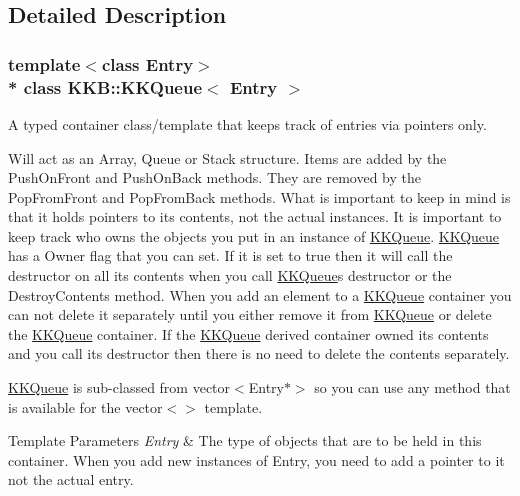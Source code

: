 \subsection{Detailed Description}
\subsubsection*{template$<$class Entry$>$\\*
class K\+K\+B\+::\+K\+K\+Queue$<$ Entry $>$}

A typed container class/template that keeps track of entries via pointers only. 

Will act as an Array, Queue or Stack structure. Items are added by the \textquotesingle{}Push\+On\+Front\textquotesingle{} and \textquotesingle{}Push\+On\+Back\textquotesingle{} methods. They are removed by the \textquotesingle{}Pop\+From\+Front\textquotesingle{} and \textquotesingle{}Pop\+From\+Back\textquotesingle{} methods. What is important to keep in mind is that it holds pointers to its contents, not the actual instances. It is important to keep track who owns the objects you put in an instance of \hyperlink{class_k_k_b_1_1_k_k_queue}{K\+K\+Queue}. \hyperlink{class_k_k_b_1_1_k_k_queue}{K\+K\+Queue} has a \textquotesingle{}Owner\textquotesingle{} flag that you can set. If it is set to \textquotesingle{}true\textquotesingle{} then it will call the destructor on all its contents when you call \hyperlink{class_k_k_b_1_1_k_k_queue}{K\+K\+Queue}\textquotesingle{}s destructor or the \textquotesingle{}Destroy\+Contents\textquotesingle{} method. When you add an element to a \hyperlink{class_k_k_b_1_1_k_k_queue}{K\+K\+Queue} container you can not delete it separately until you either remove it from \hyperlink{class_k_k_b_1_1_k_k_queue}{K\+K\+Queue} or delete the \hyperlink{class_k_k_b_1_1_k_k_queue}{K\+K\+Queue} container. If the \hyperlink{class_k_k_b_1_1_k_k_queue}{K\+K\+Queue} derived container owned its contents and you call its destructor then there is no need to delete the contents separately.

\hyperlink{class_k_k_b_1_1_k_k_queue}{K\+K\+Queue} is sub-\/classed from vector$<$\+Entry$\ast$$>$ so you can use any method that is available for the vector$<$$>$ template.


\begin{DoxyTemplParams}{Template Parameters}
{\em Entry} & The type of objects that are to be held in this container. When you add new instances of \textquotesingle{}Entry\textquotesingle{}, you need to add a pointer to it not the actual entry. \\
\hline
\end{DoxyTemplParams}


